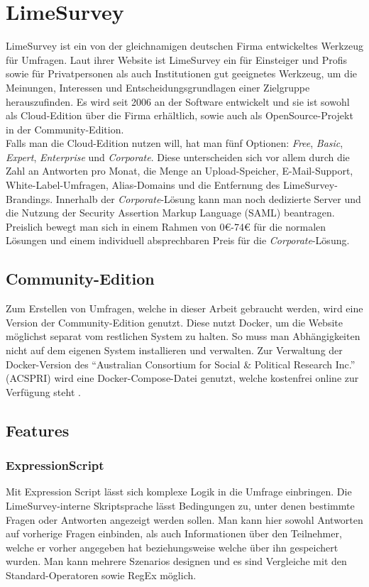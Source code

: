 \section{LimeSurvey}

LimeSurvey ist ein von der gleichnamigen deutschen Firma entwickeltes Werkzeug für Umfragen.
Laut ihrer Website ist LimeSurvey ein für Einsteiger und Profis sowie für Privatpersonen als auch Institutionen gut geeignetes Werkzeug, um die Meinungen, Interessen und Entscheidungsgrundlagen einer Zielgruppe herauszufinden.
Es wird seit 2006 an der Software entwickelt und sie ist sowohl als Cloud-Edition über die Firma erhältlich, sowie auch als OpenSource-Projekt in der Community-Edition.\\

Falls man die Cloud-Edition nutzen will, hat man fünf Optionen: \textit{Free}, \textit{Basic}, \textit{Expert}, \textit{Enterprise} und \textit{Corporate}.
Diese unterscheiden sich vor allem durch die Zahl an Antworten pro Monat, die Menge an Upload-Speicher, E-Mail-Support, White-Label-Umfragen, Alias-Domains und die Entfernung des LimeSurvey-Brandings.
Innerhalb der \textit{Corporate}-Lösung kann man noch dedizierte Server und die Nutzung der Security Assertion Markup Language (SAML) beantragen.
Preislich bewegt man sich in einem Rahmen von 0€-74€ für die normalen Lösungen und einem individuell absprechbaren Preis für die \textit{Corporate}-Lösung.

\subsection{Community-Edition}

Zum Erstellen von Umfragen, welche in dieser Arbeit gebraucht werden, wird eine Version der Community-Edition genutzt.
Diese nutzt Docker, um die Website möglichst separat vom restlichen System zu halten.
So muss man Abhängigkeiten nicht auf dem eigenen System installieren und verwalten.
Zur Verwaltung der Docker-Version des \enquote{Australian Consortium for Social \& Political Research Inc.} (ACSPRI) wird eine Docker-Compose-Datei genutzt, welche kostenfrei online zur Verfügung steht \cite{docker_comp}.

\subsection{Features}
\subsubsection{ExpressionScript}
\label{m:expr_script}
Mit Expression Script lässt sich komplexe Logik in die Umfrage einbringen.
Die LimeSurvey-interne Skriptsprache lässt Bedingungen zu, unter denen bestimmte Fragen oder Antworten angezeigt werden sollen.
Man kann hier sowohl Antworten auf vorherige Fragen einbinden, als auch Informationen über den Teilnehmer, welche er vorher angegeben hat beziehungsweise welche über ihn gespeichert wurden.
Man kann mehrere Szenarios designen und es sind Vergleiche mit den Standard-Operatoren sowie RegEx möglich.

